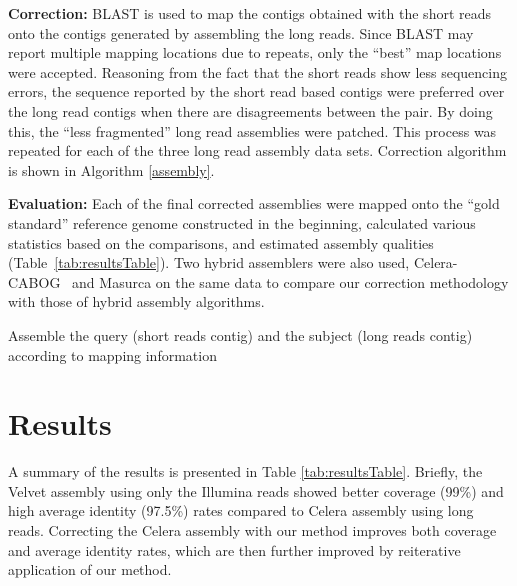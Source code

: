 \documentclass[12pt,a4paper]{cibb}
\begin{document}
\textbf{Correction:} BLAST\cite{blast} is used to map the contigs obtained with the short reads onto the contigs generated by assembling the long reads. Since BLAST may report multiple mapping locations due to repeats, only the ``best'' map locations were accepted. Reasoning from the fact that the short reads show less sequencing errors, the sequence reported by the short read based contigs were preferred over the long read contigs when there are disagreements between the pair. By doing this, the ``less fragmented'' long read assemblies were patched. This process was repeated for each of the three long read assembly data sets. Correction algorithm is shown in Algorithm \ref{assembly}. 

\textbf{Evaluation:} Each of the final corrected assemblies were mapped onto the ``gold standard'' reference genome constructed in the beginning, calculated various statistics based on the comparisons, and estimated assembly qualities (Table~\ref{tab:resultsTable}). Two hybrid assemblers were also used, Celera-CABOG~\cite{cabogMiller:2008} and Masurca \cite{masurcaZimin:2013} on the same data to compare our correction methodology with those of hybrid assembly algorithms.

\begin{algorithm}
\caption{Assemble the query (short reads contig) and the subject (long reads contig) according to mapping information}
\label{assembly}
\begin{algorithmic} 
\ENDIF
{}
\ENDIF
{}
\ENDIF
{}
\ENDIF
\end{algorithmic}
\end{algorithm}

\section{\bf Results}
\label{res}
A summary of the results is presented in Table \ref{tab:resultsTable}. Briefly, the Velvet assembly using only the Illumina reads showed better coverage (99\%) and high average identity  (97.5\%) rates compared to Celera assembly using long reads. Correcting the Celera assembly with our method improves both coverage and average identity rates, which are then further improved by reiterative application of our method. 
\end{document}

